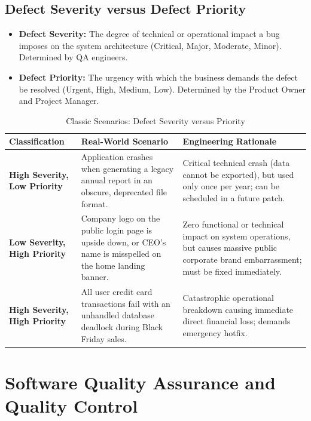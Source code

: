 \subsection{Defect Severity versus Defect Priority}
\begin{itemize}
    \item \textbf{Defect Severity:} The degree of technical or operational impact a bug imposes on the system architecture (Critical, Major, Moderate, Minor). Determined by QA engineers.
    \item \textbf{Defect Priority:} The urgency with which the business demands the defect be resolved (Urgent, High, Medium, Low). Determined by the Product Owner and Project Manager.
\end{itemize}
\begin{table}[htbp]
\centering
\small
\caption{Classic Scenarios: Defect Severity versus Priority}
\label{tab:severity_vs_priority}
\begin{tabularx}{\textwidth}{l p{5cm} X}
\toprule
\textbf{Classification} & \textbf{Real-World Scenario} & \textbf{Engineering Rationale} \\
\midrule
\textbf{High Severity, Low Priority} & Application crashes when generating a legacy annual report in an obscure, deprecated file format. & Critical technical crash (data cannot be exported), but used only once per year; can be scheduled in a future patch. \\
\textbf{Low Severity, High Priority} & Company logo on the public login page is upside down, or CEO's name is misspelled on the home landing banner. & Zero functional or technical impact on system operations, but causes massive public corporate brand embarrassment; must be fixed immediately. \\
\textbf{High Severity, High Priority} & All user credit card transactions fail with an unhandled database deadlock during Black Friday sales. & Catastrophic operational breakdown causing immediate direct financial loss; demands emergency hotfix. \\
\bottomrule
\end{tabularx}
\end{table}

\section{Software Quality Assurance and Quality Control}
\label{sec:se_sqa_sqc}

